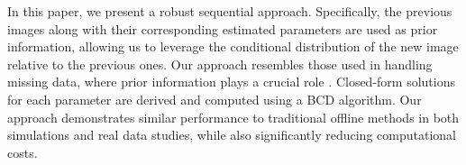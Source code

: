     
    \noindent
    In this paper, we present a robust sequential approach. %
    Specifically, the previous images along with their corresponding estimated parameters are used as prior information, allowing us to leverage the conditional distribution of the new image relative to the previous ones. Our approach resembles those used in handling missing data, where prior information plays a crucial role \citep{aubry2021structured, hippert2022robust}.
    Closed-form solutions for each parameter are derived and computed using a \acs{BCD} algorithm. Our approach demonstrates similar performance to traditional offline methods in both simulations and real data studies, while also significantly reducing computational costs. %
    
